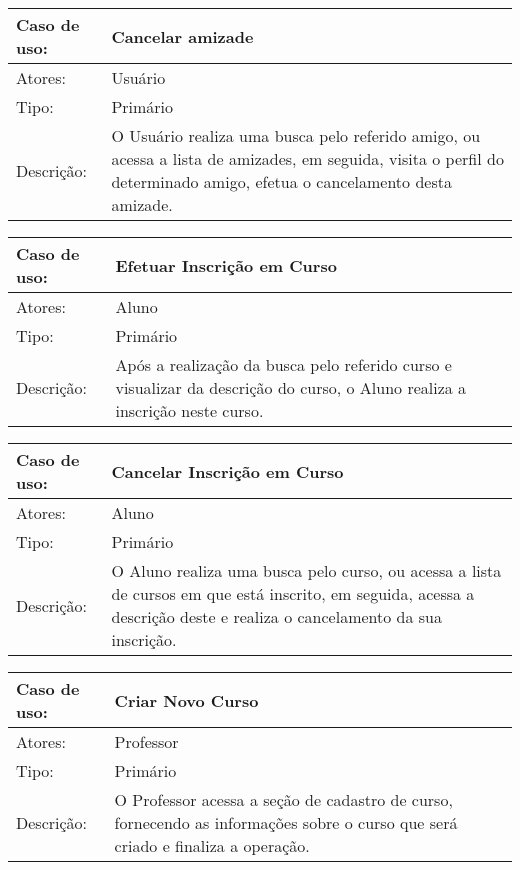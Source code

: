 \documentclass[12pt,a4paper,onecolumn,titlepage]{article}
\begin{document}
\begin{table}[h!]
\begin{center}
\begin{tabular}{p{2.5cm} p{9.5cm}}
Caso de uso: & \textbf{Cancelar amizade} \\ \hline
Atores: & Usuário \\ \hline
Tipo: & Primário \\ \hline
Descrição: & O Usuário realiza uma busca pelo referido amigo, ou acessa a lista de amizades, em seguida, visita o perfil do determinado amigo, efetua o cancelamento desta amizade.

\end{tabular}
\end{center}
\end{table}



\begin{table}[h!]
\begin{center}
\begin{tabular}{p{2.5cm} p{9.5cm}}
Caso de uso: & \textbf{Efetuar Inscrição em Curso} \\ \hline
Atores: & Aluno \\ \hline
Tipo: & Primário \\ \hline
Descrição: & Após a realização da busca pelo referido curso e visualizar da descrição do curso, o Aluno realiza a inscrição neste curso.

\end{tabular}
\end{center}
\end{table}


\begin{table}[h!]
\begin{center}
\begin{tabular}{p{2.5cm} p{9.5cm}}
Caso de uso: & \textbf{Cancelar Inscrição em Curso} \\ \hline
Atores: & Aluno \\ \hline
Tipo: & Primário \\ \hline
Descrição: & O Aluno realiza uma busca pelo curso, ou acessa a lista de cursos em que está inscrito, em seguida, acessa a descrição deste e realiza o cancelamento da sua inscrição.

\end{tabular}
\end{center}
\end{table}


\begin{table}[h!]
\begin{center}
\begin{tabular}{p{2.5cm} p{9.5cm}}
Caso de uso: & \textbf{Criar Novo Curso} \\ \hline
Atores: & Professor \\ \hline
Tipo: & Primário \\ \hline
Descrição: & O Professor acessa a seção de cadastro de curso, fornecendo as informações sobre o curso que será criado e finaliza a operação.

\end{tabular}
\end{center}
\end{table}
\end{document}
